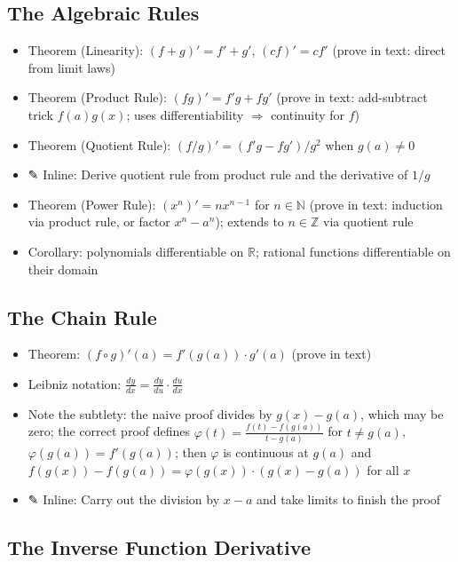 \documentclass[
  10pt,
  letterpaper,
]{scrbook}
\providecommand{\tightlist}{%
  \setlength{\itemsep}{0pt}\setlength{\parskip}{0pt}}
\newcommand{\ZZ}{\mathbb{Z}}
\newcommand{\NN}{\mathbb{N}}
\newcommand{\RR}{\mathbb{R}}
\begin{document}
\subsection{The Algebraic Rules}\label{the-algebraic-rules}

\begin{itemize}
\tightlist
\item
  Theorem (Linearity): \((f + g)' = f' + g'\), \((cf)' = cf'\) (prove in
  text: direct from limit laws)
\item
  Theorem (Product Rule): \((fg)' = f'g + fg'\) (prove in text:
  add-subtract trick \(f(a)g(x)\); uses differentiability
  \(\Rightarrow\) continuity for \(f\))
\item
  Theorem (Quotient Rule): \((f/g)' = (f'g - fg')/g^2\) when
  \(g(a) \neq 0\)
\item
  ✎ Inline: Derive quotient rule from product rule and the derivative of
  \(1/g\)
\item
  Theorem (Power Rule): \((x^n)' = nx^{n-1}\) for \(n \in \NN\) (prove
  in text: induction via product rule, or factor \(x^n - a^n\)); extends
  to \(n \in \ZZ\) via quotient rule
\item
  Corollary: polynomials differentiable on \(\RR\); rational functions
  differentiable on their domain
\end{itemize}

\subsection{The Chain Rule}\label{the-chain-rule}

\begin{itemize}
\tightlist
\item
  Theorem: \((f \circ g)'(a) = f'(g(a)) \cdot g'(a)\) (prove in text)
\item
  Leibniz notation:
  \(\frac{dy}{dx} = \frac{dy}{du} \cdot \frac{du}{dx}\)
\item
  Note the subtlety: the naive proof divides by \(g(x) - g(a)\), which
  may be zero; the correct proof defines
  \(\varphi(t) = \frac{f(t) - f(g(a))}{t - g(a)}\) for \(t \neq g(a)\),
  \(\varphi(g(a)) = f'(g(a))\); then \(\varphi\) is continuous at
  \(g(a)\) and \(f(g(x)) - f(g(a)) = \varphi(g(x)) \cdot (g(x) - g(a))\)
  for all \(x\)
\item
  ✎ Inline: Carry out the division by \(x - a\) and take limits to
  finish the proof
\end{itemize}

\subsection{The Inverse Function
Derivative}\label{the-inverse-function-derivative}
\end{document}

